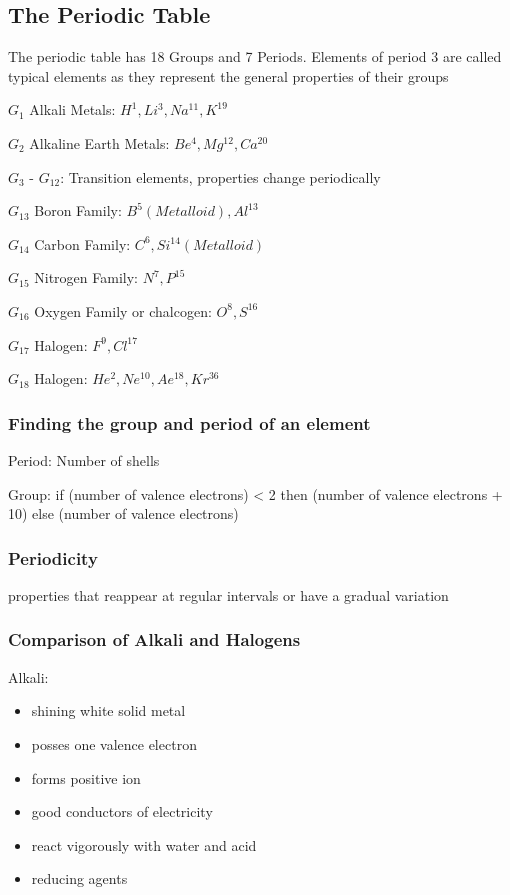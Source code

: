 \documentclass[a4paper]{article}
\begin{document}
	\subsection{The Periodic Table}

	The periodic table has 18 Groups and 7 Periods. Elements of period 3 are called typical elements as they represent the general properties of their groups

	$G_1$ Alkali Metals: $H^1, Li^3, Na^{11}, K^{19}$

	$G_2$ Alkaline Earth Metals: $Be^4, Mg^{12}, Ca^{20}$

	$G_3$ - $G_{12}$: Transition elements, properties change periodically

	$G_{13}$ Boron Family: $B^5 (Metalloid), Al^{13}$

	$G_{14}$ Carbon Family: $C^6, Si^{14} (Metalloid)$

	$G_{15}$ Nitrogen Family: $N^7, P^{15}$

	$G_{16}$ Oxygen Family or chalcogen: $O^8, S^{16}$

	$G_{17}$ Halogen: $F^9, Cl^{17}$

	$G_{18}$ Halogen: $He^2, Ne^{10}, Ae^{18}, Kr^{36}$


	\subsubsection{Finding the group and period of an element}
	Period: Number of shells

	Group: if (number of valence electrons) < 2 then (number of valence electrons + 10) else (number of valence electrons)

	\subsubsection{Periodicity}
	properties that reappear at regular intervals or have a gradual variation

	\subsubsection{Comparison of Alkali and Halogens}

	Alkali:
	\begin{itemize}
		\item shining white solid metal
		\item posses one valence electron
		\item forms positive ion
		\item good conductors of electricity
		\item react vigorously with water and acid
		\item reducing agents
	\end{itemize}
\end{document}
